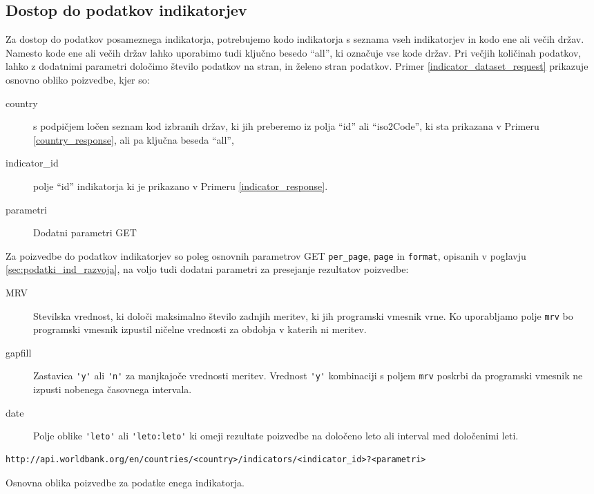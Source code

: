 \subsection{Dostop do podatkov indikatorjev}

Za dostop do podatkov posameznega indikatorja, potrebujemo kodo
indikatorja s seznama vseh indikatorjev in kodo ene ali večih držav. Namesto
kode ene ali večih držav lahko uporabimo tudi ključno besedo ``all'', ki
označuje vse kode držav. Pri večjih količinah podatkov, lahko z dodatnimi
parametri določimo število podatkov na stran, in želeno stran podatkov.
Primer \ref{indicator_dataset_request} prikazuje osnovno obliko poizvedbe,
kjer so:
\begin{description}
\item [country] s podpičjem ločen seznam kod izbranih držav, ki jih 
	  preberemo iz polja ``id'' ali ``iso2Code'', ki sta prikazana v Primeru 
    \ref{country_response}, ali pa ključna beseda ``all'',
\item [indicator\_id] polje ``id'' indikatorja ki je prikazano v Primeru 
    \ref{indicator_response}.
\item [parametri] Dodatni parametri GET 
\end{description}
Za poizvedbe do podatkov indikatorjev so poleg osnovnih parametrov GET 
\verb|per_page|, \verb|page| in \verb|format|, opisanih v poglavju 
\ref{sec:podatki_ind_razvoja}, na voljo tudi dodatni parametri za presejanje
rezultatov poizvedbe:
\begin{description}  
\item [MRV] Stevilska vrednost, ki določi maksimalno število zadnjih meritev,
    ki jih programski vmesnik vrne. Ko uporabljamo polje \verb|mrv| bo 
    programski vmesnik izpustil ničelne vrednosti za obdobja v katerih ni
    meritev.
\item [gapfill] Zastavica \verb|'y'| ali \verb|'n'| za manjkajoče vrednosti meritev.
    Vrednost \verb|'y'| kombinaciji s poljem \verb|mrv| poskrbi da programski 
    vmesnik ne izpusti nobenega časovnega intervala.
\item [date] Polje oblike \verb|'leto'| ali \verb|'leto:leto'| ki omeji rezultate poizvedbe
    na določeno leto ali interval med določenimi leti. 
\end{description}


\begin{snippet}
\begin{center}
\begin{lstlisting}
http://api.worldbank.org/en/countries/<country>/indicators/<indicator_id>?<parametri>
\end{lstlisting}
\end{center}
\caption{Osnovna oblika poizvedbe za podatke enega indikatorja.}
\label{indicator_dataset_request}
\end{snippet} 

